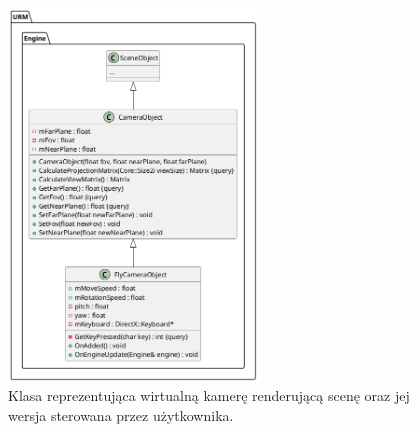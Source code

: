 	\begin{figure}[h!]
		\centering
		\includegraphics[width=250px]{images/UML/sceneobjects_camera.png}
		\caption{Klasa reprezentująca wirtualną kamerę renderującą scenę oraz jej wersja sterowana przez użytkownika.}
		\label{UML_SceneObjects_Camera}
	\end{figure}
	

